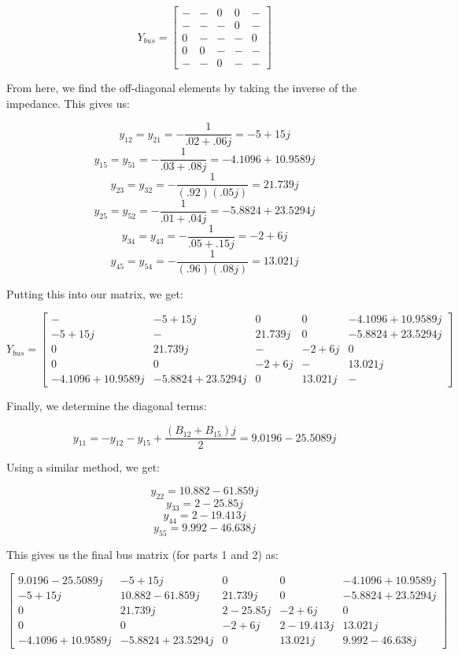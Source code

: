 \documentclass[
	letterpaper, %
	10pt, %
]{CSUniSchoolLabReport}
\begin{document}
$$Y_{bus}=\left[ \begin{matrix} - & - & 0 & 0 & -\\ - & - & - & 0 & -\\ 0 & - & - & - & 0\\ 0 & 0 & - & - & -\\ - & - & 0 & - & - \end{matrix} \right]$$

From here, we find the off-diagonal elements by taking the inverse of the impedance. This gives us:

$$y_{12}=y_{21}=-\frac{1}{.02+.06j}=-5+15j$$
$$y_{15}=y_{51}=-\frac{1}{.03+.08j}=-4.1096+10.9589j$$
$$y_{23}=y_{32}=-\frac{1}{(.92)(.05j)}=21.739j$$
$$y_{25}=y_{52}=-\frac{1}{.01+.04j}=-5.8824+23.5294j$$
$$y_{34}=y_{43}=-\frac{1}{.05+.15j}=-2+6j$$
$$y_{45}=y_{54}=-\frac{1}{(.96)(.08j)}=13.021j$$

Putting this into our matrix, we get:

$$Y_{bus}=\left[ \begin{matrix} - & -5+15j & 0 & 0 & -4.1096+10.9589j\\ -5+15j & - & 21.739j & 0 & -5.8824+23.5294j\\ 0 & 21.739j & - & -2+6j & 0\\ 0 & 0 & -2+6j & - & 13.021j\\ -4.1096+10.9589j & -5.8824+23.5294j & 0 & 13.021j & - \end{matrix} \right]$$

Finally, we determine the diagonal terms:

$$y_{11}=-y_{12}-y_{15}+\frac{(B_{12}+B_{15})j}{2}=9.0196-25.5089j$$

Using a similar method, we get:

$$y_{22}=10.882-61.859j$$
$$y_{33}=2-25.85j$$
$$y_{44}=2-19.413j$$
$$y_{55}=9.992-46.638j$$

This gives us the final bus matrix (for parts 1 and 2) as:

$$\boxed{\left[ \begin{matrix} 9.0196-25.5089j & -5+15j & 0 & 0 & -4.1096+10.9589j\\ -5+15j & 10.882-61.859j & 21.739j & 0 & -5.8824+23.5294j\\ 0 & 21.739j & 2-25.85j & -2+6j & 0\\ 0 & 0 & -2+6j & 2-19.413j & 13.021j\\ -4.1096+10.9589j & -5.8824+23.5294j & 0 & 13.021j & 9.992-46.638j \end{matrix} \right]}$$
\end{document}
